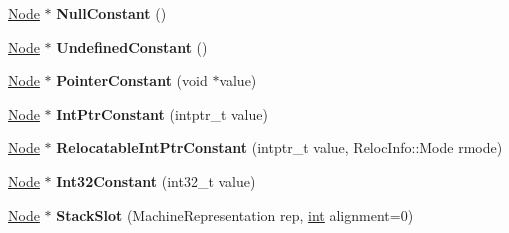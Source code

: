 \begin{DoxyCompactItemize}
\mbox{\label{classv8_1_1internal_1_1compiler_1_1RawMachineAssembler_af71da5cbddcd9719f9ca00f49be5e484}} 
\mbox{\hyperlink{classv8_1_1internal_1_1compiler_1_1Node}{Node}} $\ast$ {\bfseries Null\+Constant} ()
\item 
\mbox{\label{classv8_1_1internal_1_1compiler_1_1RawMachineAssembler_ae6267a265732ae1cd32ed760989728fc}} 
\mbox{\hyperlink{classv8_1_1internal_1_1compiler_1_1Node}{Node}} $\ast$ {\bfseries Undefined\+Constant} ()
\item 
\mbox{\label{classv8_1_1internal_1_1compiler_1_1RawMachineAssembler_a69611bb22bf253965103bbe3eb43aac7}} 
\mbox{\hyperlink{classv8_1_1internal_1_1compiler_1_1Node}{Node}} $\ast$ {\bfseries Pointer\+Constant} (void $\ast$value)
\item 
\mbox{\label{classv8_1_1internal_1_1compiler_1_1RawMachineAssembler_ad78a6bc4eeb70c9b5f847c503f75335b}} 
\mbox{\hyperlink{classv8_1_1internal_1_1compiler_1_1Node}{Node}} $\ast$ {\bfseries Int\+Ptr\+Constant} (intptr\+\_\+t value)
\item 
\mbox{\label{classv8_1_1internal_1_1compiler_1_1RawMachineAssembler_a905cfb884637d8a59bf1633ebe1bcf48}} 
\mbox{\hyperlink{classv8_1_1internal_1_1compiler_1_1Node}{Node}} $\ast$ {\bfseries Relocatable\+Int\+Ptr\+Constant} (intptr\+\_\+t value, Reloc\+Info\+::\+Mode rmode)
\item 
\mbox{\label{classv8_1_1internal_1_1compiler_1_1RawMachineAssembler_a2568f92a752d08c1a4bf34176ba94dc3}} 
\mbox{\hyperlink{classv8_1_1internal_1_1compiler_1_1Node}{Node}} $\ast$ {\bfseries Int32\+Constant} (int32\+\_\+t value)
\item 
\mbox{\label{classv8_1_1internal_1_1compiler_1_1RawMachineAssembler_a6912e87145b6f4a8fc9508495cb4cf3b}} 
\mbox{\hyperlink{classv8_1_1internal_1_1compiler_1_1Node}{Node}} $\ast$ {\bfseries Stack\+Slot} (Machine\+Representation rep, \mbox{\hyperlink{classint}{int}} alignment=0)

\end{DoxyCompactItemize}
